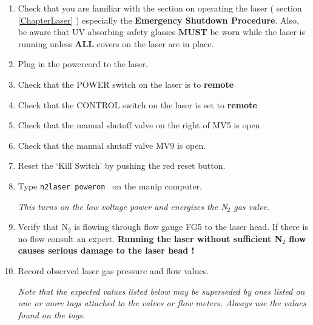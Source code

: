 \begin{enumerate}
\item\checkbox Check that you are familiar with the section on operating the laser 
( section \ref{ChapterLaser} ) especially the {\bf Emergency Shutdown Procedure}. Also, be
aware that UV absorbing safety glasses {\bf MUST} be worn while
the laser is running unless {\bf ALL } covers on the laser are in place.


\item\checkbox Plug in the powercord to the laser.

\item\checkbox Check that the POWER  switch on the laser is to {\bf remote}

\item\checkbox Check that the CONTROL switch on the laser is set to {\bf remote}

\item\checkbox Check that the manual shutoff valve on the right of MV5 is open

\item\checkbox Check that the manual shutoff valve MV9 is open.

\item\checkbox  Reset the `Kill Switch' by pushing the red reset button.

\item\checkbox Type {\tt n2laser poweron } on the manip computer.
   \small
   {\em
 This turns on the low voltage power and  energizes the N$_2$ gas valve.

   }
   \normalsize


  
\item\checkbox Verify that N$_2$ is flowing through flow gauge FG5 to the laser head.
If there is no flow consult an expert. {\bf Running the laser without sufficient N$_2$ flow
causes serious damage to the laser head !}

\item\checkbox Record observed laser gas pressure  and
  flow values.

\small
{\em Note that the expected values listed below may be superseded by ones
listed on one or more tags attached to the valves or flow meters. Always use the values found on the tags.}
\normalsize


\end{enumerate}
